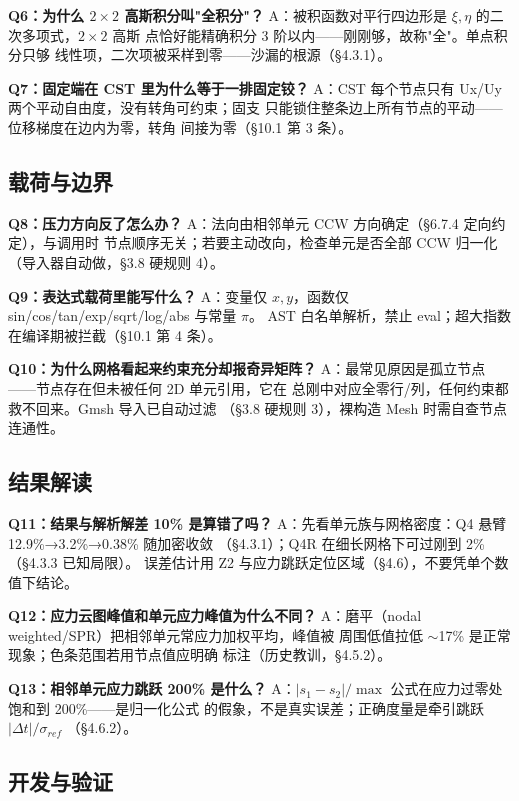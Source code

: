 \documentclass[12pt,a4paper]{ctexart}
\begin{document}
\textbf{Q6：为什么 $2\times2$ 高斯积分叫"全积分"？}
A：被积函数对平行四边形是 $\xi,\eta$ 的二次多项式，$2\times2$ 高斯
点恰好能精确积分 3 阶以内——刚刚够，故称"全"。单点积分只够
线性项，二次项被采样到零——沙漏的根源（§4.3.1）。

\textbf{Q7：固定端在 CST 里为什么等于一排固定铰？}
A：CST 每个节点只有 Ux/Uy 两个平动自由度，没有转角可约束；固支
只能锁住整条边上所有节点的平动——位移梯度在边内为零，转角
间接为零（§10.1 第 3 条）。

\subsection{载荷与边界}

\textbf{Q8：压力方向反了怎么办？}
A：法向由相邻单元 CCW 方向确定（§6.7.4 定向约定），与调用时
节点顺序无关；若要主动改向，检查单元是否全部 CCW 归一化
（导入器自动做，§3.8 硬规则 4）。

\textbf{Q9：表达式载荷里能写什么？}
A：变量仅 $x,y$，函数仅 sin/cos/tan/exp/sqrt/log/abs 与常量 $\pi$。
AST 白名单解析，禁止 eval；超大指数在编译期被拦截（§10.1 第 4 条）。

\textbf{Q10：为什么网格看起来约束充分却报奇异矩阵？}
A：最常见原因是孤立节点——节点存在但未被任何 2D 单元引用，它在
总刚中对应全零行/列，任何约束都救不回来。Gmsh 导入已自动过滤
（§3.8 硬规则 3），裸构造 Mesh 时需自查节点连通性。

\subsection{结果解读}

\textbf{Q11：结果与解析解差 10\% 是算错了吗？}
A：先看单元族与网格密度：Q4 悬臂 12.9\%→3.2\%→0.38\% 随加密收敛
（§4.3.1）；Q4R 在细长网格下可过刚到 2\%（§4.3.3 已知局限）。
误差估计用 Z2 与应力跳跃定位区域（§4.6），不要凭单个数值下结论。

\textbf{Q12：应力云图峰值和单元应力峰值为什么不同？}
A：磨平（nodal weighted/SPR）把相邻单元常应力加权平均，峰值被
周围低值拉低 $\sim$17\% 是正常现象；色条范围若用节点值应明确
标注（历史教训，§4.5.2）。

\textbf{Q13：相邻单元应力跳跃 200\% 是什么？}
A：$|s_1-s_2|/\max$ 公式在应力过零处饱和到 200\%——是归一化公式
的假象，不是真实误差；正确度量是牵引跳跃 $|\Delta t|/\sigma_{ref}$
（§4.6.2）。

\subsection{开发与验证}
\end{document}
